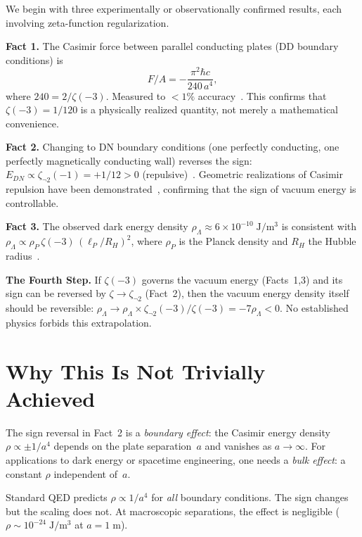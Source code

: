 \documentclass[aps,prl,twocolumn,superscriptaddress,nofootinbib]{revtex4-2}
\begin{document}
We begin with three experimentally or observationally confirmed
results, each involving zeta-function regularization.

\medskip
\noindent\textbf{Fact 1.}  The Casimir force between parallel
conducting plates (DD boundary conditions) is
\begin{equation}
  F/A = -\frac{\pi^2\hbar c}{240\,a^4},
\end{equation}
where $240=2/\zeta(-3)$.  Measured to $<1\%$
accuracy~\cite{Mohideen1998,Decca2007}.  This confirms that
$\zeta(-3)=1/120$ is a physically realized quantity, not merely a
mathematical convenience.

\medskip
\noindent\textbf{Fact 2.}  Changing to DN boundary conditions
(one perfectly conducting, one perfectly magnetically conducting
wall) reverses the sign:
$E_{DN}\propto\zeta_{\neg 2}(-1)=+1/12>0$
(repulsive)~\cite{Boyer1974,Kenneth2002}.
Geometric realizations of Casimir repulsion have been
demonstrated~\cite{Munday2009,Princeton2017}, confirming that
the sign of vacuum energy is controllable.

\medskip
\noindent\textbf{Fact 3.}  The observed dark energy density
$\rho_\Lambda\approx 6\times 10^{-10}\;\mathrm{J/m^3}$ is
consistent with $\rho_\Lambda\propto\rho_P\,\zeta(-3)\,
(\ell_P/R_H)^2$, where $\rho_P$ is the Planck density and
$R_H$ the Hubble radius~\cite{WB2026}.

\medskip
\noindent\textbf{The Fourth Step.}  If $\zeta(-3)$ governs the
vacuum energy (Facts~1,3) and its sign can be reversed by
$\zeta\to\zeta_{\neg 2}$ (Fact~2), then the vacuum energy
density itself should be reversible:
$\rho_\Lambda\to\rho_\Lambda\times\zeta_{\neg 2}(-3)/\zeta(-3)
=-7\rho_\Lambda<0$.  No established physics forbids this
extrapolation.

\section{Why This Is Not Trivially Achieved}

The sign reversal in Fact~2 is a \emph{boundary effect}: the
Casimir energy density $\rho\propto\pm 1/a^4$ depends on the
plate separation~$a$ and vanishes as $a\to\infty$.  For
applications to dark energy or spacetime engineering, one needs
a \emph{bulk effect}: a constant $\rho$ independent of~$a$.

Standard QED predicts $\rho\propto 1/a^4$ for \emph{all} boundary
conditions.  The sign changes but the scaling does not.  At
macroscopic separations, the effect is negligible ($\rho\sim
10^{-24}\;\mathrm{J/m^3}$ at $a=1\;\mathrm{m}$).
\end{document}
